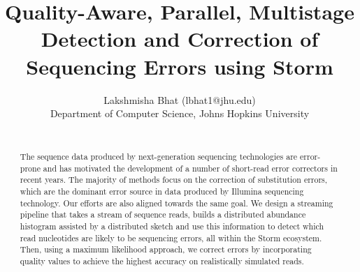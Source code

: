 \documentclass[11pt]{article}
\begin{document}
\pagestyle{plain} 
\title{Quality-Aware, Parallel, Multistage Detection and Correction of Sequencing Errors using Storm}
\large
\date{}
\author{Lakshmisha Bhat (lbhat1@jhu.edu) \\Department of Computer Science, Johns Hopkins University \\[2\baselineskip]\\ }
\maketitle
\vspace{-.5in}
\cfoot{\thepage}
\rfoot{}
\rhead{}


\begin{abstract}
The sequence data produced by next-generation sequencing technologies are error-prone and has motivated the development of a number of short-read error correctors in recent years. The majority of methods focus on the correction of substitution errors, which are the dominant error source in data produced by Illumina sequencing technology. Our efforts are also aligned towards the same goal. We design a streaming pipeline that takes a stream of sequence reads, builds a distributed abundance histogram assisted by a distributed sketch and use this information to detect which read nucleotides are likely to be sequencing errors, all within the Storm ecosystem. Then, using a maximum likelihood approach, we correct errors by incorporating quality values to achieve the highest accuracy on realistically simulated reads.\\
\end{abstract}
\end{document}
